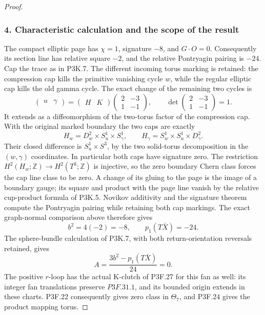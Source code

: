 \begin{proof}
\subsubsection{4. Characteristic calculation and the scope of the result}\label{characteristic-calculation-and-the-scope-of-the-result}

The compact elliptic page has \(\chi=1\), signature \(-8\), and \(G\cdot O=0\). Consequently its section line has relative square \(-2\), and the relative Pontryagin pairing is \(-24\). Cap the trace as in P3K.7. The different incoming torus marking is retained: the compression cap kills the primitive vanishing cycle \(w\), while the regular elliptic cap kills the old gamma cycle. The exact change of the remaining two cycles is \[
 \begin{pmatrix}u&\gamma\end{pmatrix}
 =\begin{pmatrix}H&K\end{pmatrix}
   \begin{pmatrix}2&-3\\1&-1\end{pmatrix},
 \qquad\det\begin{pmatrix}2&-3\\1&-1\end{pmatrix}=1.
\] It extends as a diffeomorphism of the two-torus factor of the compression cap. With the original marked boundary the two caps are exactly \[
 H_w=D^2_w\times S^1_u\times S^1_\gamma,\qquad
 H_\gamma=S^1_w\times S^1_u\times D^2_\gamma.
\] Their closed difference is \(S^1_u\times S^3\), by the two solid-torus decomposition in the \((w,\gamma)\) coordinates. In particular both caps have signature zero. The restriction \(H^2(H_w;\mathbb Z)\to H^2(T^3;\mathbb Z)\) is injective, so the zero boundary Chern class forces the cap line class to be zero. A change of its gluing to the page is the image of a boundary gauge; its square and product with the page line vanish by the relative cup-product formula of P3K.5. Novikov additivity and the signature theorem compute the Pontryagin pairing while retaining both cap markings. The exact graph-normal comparison above therefore gives \[
 b^2=4(-2)=-8,\qquad p_1(T\bar X)=-24.
\] The sphere-bundle calculation of P3K.7, with both return-orientation reversals retained, gives \[
 A=\frac{3b^2-p_1(T\bar X)}{24}=0.
\] The positive \(r\)-loop has the actual K-clutch of P3F.27 for this fan as well: its integer fan translations preserve \(P3F.31.1\), and its bounded origin extends in these charts. P3F.22 consequently gives zero class in \(\Theta_7\), and P3F.24 gives the product mapping torus.


\end{proof}
